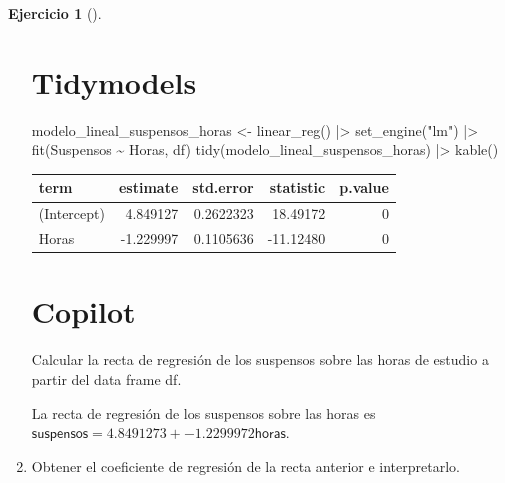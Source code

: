 \documentclass[
  a4paper,
]{scrreport}
\newenvironment{Shaded}{\begin{snugshade}}{\end{snugshade}}
\newcommand{\ExtensionTok}[1]{\textcolor[rgb]{0.00,0.23,0.31}{#1}}
\newcommand{\FunctionTok}[1]{\textcolor[rgb]{0.28,0.35,0.67}{#1}}
\newcommand{\NormalTok}[1]{\textcolor[rgb]{0.00,0.23,0.31}{#1}}
\newcommand{\OtherTok}[1]{\textcolor[rgb]{0.00,0.23,0.31}{#1}}
\newcommand{\SpecialCharTok}[1]{\textcolor[rgb]{0.37,0.37,0.37}{#1}}
\newcommand{\StringTok}[1]{\textcolor[rgb]{0.13,0.47,0.30}{#1}}
\theoremstyle{definition}
\newtheorem{exercise}{Ejercicio}[chapter]
\theoremstyle{remark}
\begin{document}
\begin{exercise}[]
\begin{enumerate}
\begin{tcolorbox}
  \section{Tidymodels}

\begin{Shaded}
\begin{Highlighting}[]
\NormalTok{modelo\_lineal\_suspensos\_horas }\OtherTok{\textless{}{-}} \FunctionTok{linear\_reg}\NormalTok{() }\SpecialCharTok{|\textgreater{}}
  \FunctionTok{set\_engine}\NormalTok{(}\StringTok{"lm"}\NormalTok{) }\SpecialCharTok{|\textgreater{}} 
  \FunctionTok{fit}\NormalTok{(Suspensos }\SpecialCharTok{\textasciitilde{}}\NormalTok{ Horas, df)}
\FunctionTok{tidy}\NormalTok{(modelo\_lineal\_suspensos\_horas) }\SpecialCharTok{|\textgreater{}} \FunctionTok{kable}\NormalTok{()}
\end{Highlighting}
\end{Shaded}

  \begin{longtable}[]{@{}lrrrr@{}}
  \toprule\noalign{}
  term & estimate & std.error & statistic & p.value \\
  \midrule\noalign{}
  \endhead
  \bottomrule\noalign{}
  \endlastfoot
  (Intercept) & 4.849127 & 0.2622323 & 18.49172 & 0 \\
  Horas & -1.229997 & 0.1105636 & -11.12480 & 0 \\
  \end{longtable}

  \section{Copilot}

\begin{Shaded}
\begin{Highlighting}[]
\ExtensionTok{Calcular}\NormalTok{ la recta de regresión de los suspensos sobre las horas de estudio a partir del data frame df.}
\end{Highlighting}
\end{Shaded}

  La recta de regresión de los suspensos sobre las horas es
  \(\textsf{suspensos}= 4.8491273 + -1.2299972 \textsf{horas}\).

  \end{tcolorbox}
\item
  Obtener el coeficiente de regresión de la recta anterior e
  interpretarlo.

  \begin{tcolorbox}[enhanced jigsaw, colframe=quarto-callout-tip-color-frame, toprule=.15mm, bottomtitle=1mm, breakable, opacitybacktitle=0.6, toptitle=1mm, colback=white, bottomrule=.15mm, title=\textcolor{quarto-callout-tip-color}{\faLightbulb}\hspace{0.5em}{Solución}, arc=.35mm, left=2mm, titlerule=0mm, rightrule=.15mm, coltitle=black, leftrule=.75mm, opacityback=0, colbacktitle=quarto-callout-tip-color!10!white]


\end{tcolorbox}
\end{enumerate}
\end{exercise}
\end{document}
